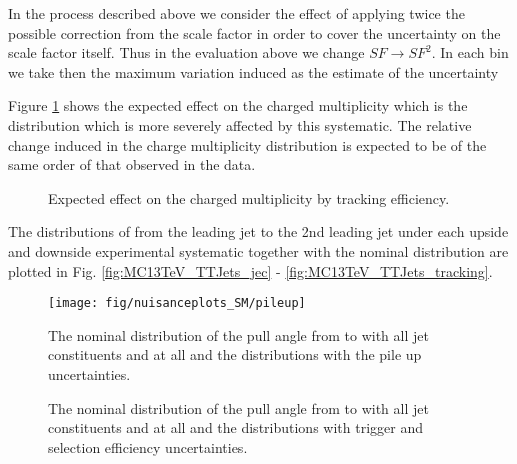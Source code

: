 \begin{description}
In the process described above we consider the effect of applying twice the possible correction from the scale factor in order to cover the uncertainty on the scale factor itself. Thus in the evaluation above we change $SF\rightarrow SF^2$. In each bin we take then the maximum variation induced as the estimate of the uncertainty 

Figure \ref{fig:tkeffsysts} shows the expected effect on the charged multiplicity which is the distribution which is more severely affected by this systematic. The relative change induced in the charge multiplicity distribution is expected to be of the same order of that observed in the data.

\begin{figure}[!htp]
\centering
{}\hfil
{}
\caption{Expected effect on the charged multiplicity by tracking efficiency.}
\label{fig:tkeffsysts}
\end{figure}

The distributions of \pullangle from the leading jet \leadingjet to the 2nd leading jet \scndleadingjet under each upside and downside experimental systematic together with the nominal distribution are plotted in Fig. \ref{fig:MC13TeV_TTJets_jec} - \ref{fig:MC13TeV_TTJets_tracking}.

\begin{figure}[hbtp]
\centering
\def\twidth{0.45}
\texttt{[image: fig/nuisanceplots\_SM/pileup]}
\caption{The nominal distribution of the pull angle from \leadingjet to \scndleadingjet with all jet constituents and at all \DeltaR and the distributions with the pile up uncertainties.}
\label{fig:pileup}
\end{figure}

\begin{figure}[hbtp]
\centering
\def\twidth{0.45}
\hfil
{}
\caption{The nominal distribution of the pull angle from \leadingjet to \scndleadingjet with all jet constituents and at all \DeltaR and the distributions with trigger and selection efficiency uncertainties.}
\label{fig:trigselcorrection}
\end{figure}


\end{description}
